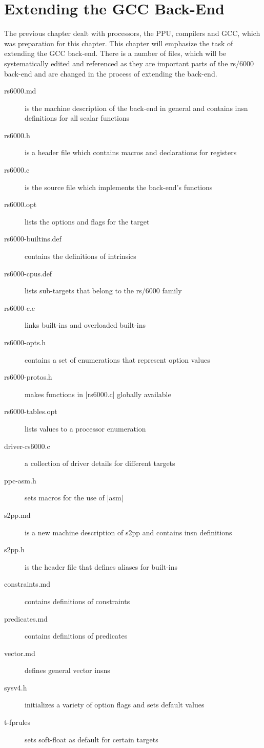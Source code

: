 \chapter{Extending the \ac{GCC} Back-End}
\label{chapter:extbackend}
The previous chapter dealt with processors, the \ac{PPU}, compilers and \ac{GCC}, which was preparation for this chapter.
This chapter will emphasize the task of extending the \ac{GCC} back-end.
There is a number of files, which will be systematically edited and referenced as they are important parts of the \ac{rs/6000} back-end and are changed in the process of extending the back-end. 
\begin{description}
    \item[rs6000.md] is the machine description of the back-end in general and contains insn definitions for all scalar functions
    \item[rs6000.h] is a header file which contains macros and declarations for registers
    \item[rs6000.c] is the source file which implements the back-end's functions
    \item[rs6000.opt] lists the options and flags for the target
    \item[rs6000-builtins.def] contains the definitions of intrinsics
    \item[rs6000-cpus.def] lists sub-targets that belong to the \ac{rs/6000} family
    \item[rs6000-c.c] links built-ins and overloaded built-ins
    \item[rs6000-opts.h] contains a set of enumerations that represent option values
    \item[rs6000-protos.h] makes functions in |rs6000.c| globally available
    \item[rs6000-tables.opt] lists values to a processor enumeration
    \item[driver-rs6000.c] a collection of driver details for different targets
    \item[ppc-asm.h] sets macros for the use of |asm|
    \item[s2pp.md] is a new machine description of \ac{s2pp} and contains insn definitions
    \item[s2pp.h] is the header file that defines aliases for built-ins
    \item[constraints.md] contains definitions of constraints
    \item[predicates.md] contains definitions of predicates
    \item[vector.md] defines general vector insns
    \item[sysv4.h] initializes a variety of option flags and sets default values
    \item[t-fprules] sets soft-float as default for certain targets
\end{description}

